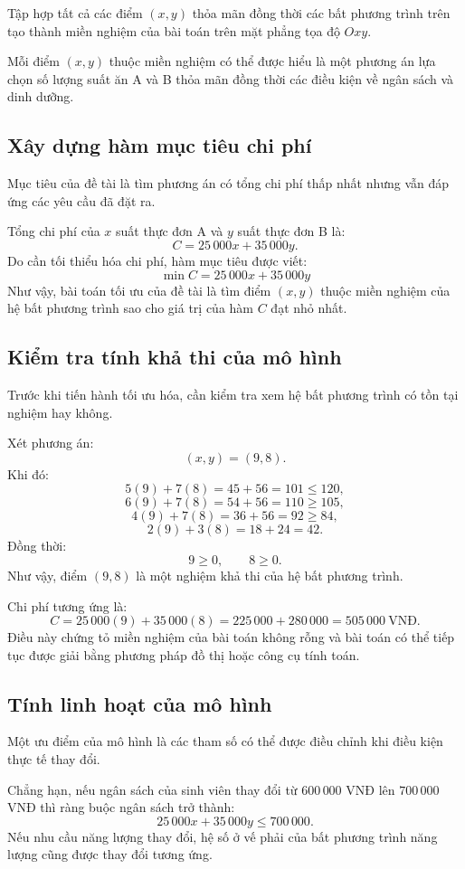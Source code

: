 \documentclass[12pt,a4paper]{article}
\begin{document}
Tập hợp tất cả các điểm $(x,y)$ thỏa mãn đồng thời các bất phương trình trên tạo thành miền nghiệm của bài toán trên mặt phẳng tọa độ
$Oxy$.

Mỗi điểm $(x,y)$ thuộc miền nghiệm có thể được hiểu là một phương án lựa chọn số lượng suất ăn A và B thỏa mãn đồng thời các điều kiện về ngân sách và dinh dưỡng.

\subsection{Xây dựng hàm mục tiêu chi phí}

Mục tiêu của đề tài là tìm phương án có tổng chi phí thấp nhất nhưng vẫn đáp ứng các yêu cầu đã đặt ra.

Tổng chi phí của $x$ suất thực đơn A và $y$ suất thực đơn B là:
\[
C=25\,000x+35\,000y.
\]
Do cần tối thiểu hóa chi phí, hàm mục tiêu được viết:
\[
\boxed{
\min C=25\,000x+35\,000y
}
\]
Như vậy, bài toán tối ưu của đề tài là tìm điểm $(x,y)$ thuộc miền nghiệm của hệ bất phương trình sao cho giá trị của hàm $C$ đạt nhỏ nhất.

\subsection{Kiểm tra tính khả thi của mô hình}

Trước khi tiến hành tối ưu hóa, cần kiểm tra xem hệ bất phương trình có tồn tại nghiệm hay không.

Xét phương án:
\[
(x,y)=(9,8).
\]
Khi đó:
\[
5(9)+7(8)=45+56=101\leq120,
\]
\[
6(9)+7(8)=54+56=110\geq105,
\]
\[
4(9)+7(8)=36+56=92\geq84,
\]
\[
2(9)+3(8)=18+24=42.
\]
Đồng thời:
\[
9\geq0,\qquad8\geq0.
\]
Như vậy, điểm $(9,8)$ là một nghiệm khả thi của hệ bất phương trình.

Chi phí tương ứng là:
\[
C=25\,000(9)+35\,000(8)
=225\,000+280\,000
=505\,000\ \text{VNĐ}.
\]
Điều này chứng tỏ miền nghiệm của bài toán không rỗng và bài toán có thể tiếp tục được giải bằng phương pháp đồ thị hoặc công cụ tính toán.

\subsection{Tính linh hoạt của mô hình}

Một ưu điểm của mô hình là các tham số có thể được điều chỉnh khi điều kiện thực tế thay đổi.

Chẳng hạn, nếu ngân sách của sinh viên thay đổi từ $600\,000$ VNĐ lên
$700\,000$ VNĐ thì ràng buộc ngân sách trở thành:
\[
25\,000x+35\,000y\leq700\,000.
\]
Nếu nhu cầu năng lượng thay đổi, hệ số ở vế phải của bất phương trình năng lượng cũng được thay đổi tương ứng.
\end{document}
